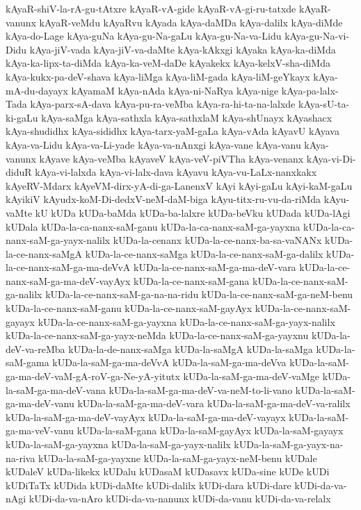 {kAyaR-shiV-la-rA-gu-tAtxre
kAyaR-vA-gide
kAyaR-vA-gi-ru-tatxde
kAyaR-vanunx
kAyaR-veMdu
kAyaRvu
kAyada
kAya-daMDa
kAya-dalilx
kAya-diMde
kAya-do-Lage
kAya-guNa
kAya-gu-Na-gaLu
kAya-gu-Na-va-Lidu
kAya-gu-Na-vi-Didu
kAya-jiV-vada
kAya-jiV-va-daMte
kAya-kAkxgi
kAyaka
kAya-ka-diMda
kAya-ka-lipx-ta-diMda
kAya-ka-veM-daDe
kAyakekx
kAya-kelxV-sha-diMda
kAya-kukx-pa-deV-shava
kAya-liMga
kAya-liM-gada
kAya-liM-geYkayx
kAya-mA-du-dayayx
kAyamaM
kAya-nAda
kAya-ni-NaRya
kAya-nige
kAya-pa-lalx-Tada
kAya-parx-sA-dava
kAya-pu-ra-veMba
kAya-ra-hi-ta-na-lalxde
kAya-sU-ta-ki-gaLu
kAya-saMga
kAya-sathxla
kAya-sathxlaM
kAya-shUnayx
kAyashacx
kAya-shudidhx
kAya-sididhx
kAya-tarx-yaM-gaLa
kAya-vAda
kAyavU
kAyava
kAya-va-Lidu
kAya-va-Li-yade
kAya-va-nAnxgi
kAya-vane
kAya-vanu
kAya-vanunx
kAyave
kAya-veMba
kAyaveV
kAya-veV-piVTha
kAya-venanx
kAya-vi-Di-diduR
kAya-vi-lalxda
kAya-vi-lalx-dava
kAyavu
kAya-vu-LaLx-nanxkakx
kAyeRV-Mdarx
kAyeVM-dirx-yA-di-ga-LanenxV
kAyi
kAyi-gaLu
kAyi-kaM-gaLu
kAyikiV
kAyudx-koM-Di-dedxV-neM-daM-biga
kAyu-titx-ru-vu-da-riMda
kAyu-vaMte
kU
kUDa
kUDa-baMda
kUDa-ba-lalxre
kUDa-beVku
kUDada
kUDa-lAgi
kUDala
kUDa-la-ca-nanx-saM-ganu
kUDa-la-ca-nanx-saM-ga-yayxna
kUDa-la-ca-nanx-saM-ga-yayx-nalilx
kUDa-la-cenanx
kUDa-la-ce-nanx-ba-sa-vaNANx
kUDa-la-ce-nanx-saMgA
kUDa-la-ce-nanx-saMga
kUDa-la-ce-nanx-saM-ga-dalilx
kUDa-la-ce-nanx-saM-ga-ma-deVvA
kUDa-la-ce-nanx-saM-ga-ma-deV-vara
kUDa-la-ce-nanx-saM-ga-ma-deV-vayAyx
kUDa-la-ce-nanx-saM-gana
kUDa-la-ce-nanx-saM-ga-nalilx
kUDa-la-ce-nanx-saM-ga-na-na-ridu
kUDa-la-ce-nanx-saM-ga-neM-benu
kUDa-la-ce-nanx-saM-ganu
kUDa-la-ce-nanx-saM-gayAyx
kUDa-la-ce-nanx-saM-gayayx
kUDa-la-ce-nanx-saM-ga-yayxna
kUDa-la-ce-nanx-saM-ga-yayx-nalilx
kUDa-la-ce-nanx-saM-ga-yayx-neMda
kUDa-la-ce-nanx-saM-ga-yayxnu
kUDa-la-deV-va-reMba
kUDa-la-de-nanx-saMga
kUDa-la-saMgA
kUDa-la-saMga
kUDa-la-saM-gama
kUDa-la-saM-ga-ma-deVvA
kUDa-la-saM-ga-ma-deVva
kUDa-la-saM-ga-ma-deV-vaM-gA-roV-ga-Ne-yA-yitutx
kUDa-la-saM-ga-ma-deV-vaMge
kUDa-la-saM-ga-ma-deV-vana
kUDa-la-saM-ga-ma-deV-va-neM-to-li-vano
kUDa-la-saM-ga-ma-deV-vanu
kUDa-la-saM-ga-ma-deV-vara
kUDa-la-saM-ga-ma-deV-va-ralilx
kUDa-la-saM-ga-ma-deV-vayAyx
kUDa-la-saM-ga-ma-deV-vayayx
kUDa-la-saM-ga-ma-veV-vanu
kUDa-la-saM-gana
kUDa-la-saM-gayAyx
kUDa-la-saM-gayayx
kUDa-la-saM-ga-yayxna
kUDa-la-saM-ga-yayx-nalilx
kUDa-la-saM-ga-yayx-na-na-riva
kUDa-la-saM-ga-yayxne
kUDa-la-saM-ga-yayx-neM-benu
kUDale
kUDaleV
kUDa-likekx
kUDalu
kUDasaM
kUDasavx
kUDa-sine
kUDe
kUDi
kUDiTaTx
kUDida
kUDi-daMte
kUDi-dalilx
kUDi-dara
kUDi-dare
kUDi-da-va-nAgi
kUDi-da-va-nAro
kUDi-da-va-nanunx
kUDi-da-vanu
kUDi-da-va-relalx
}

